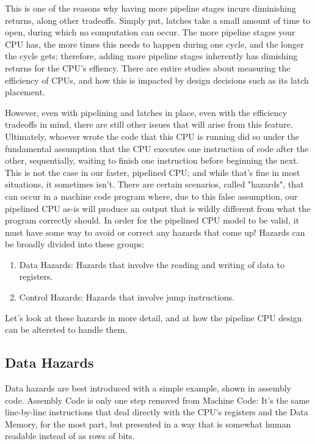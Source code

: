 \documentclass[12pt,twoside]{reedthesis}
\begin{document}
This is one of the reasons why having more pipeline stages incurs diminishing returns, along other tradeoffs. Simply put, latches take a small amount of time to open, during which no computation can occur. The more pipeline stages your CPU has, the more times this needs to happen during one cycle, and the longer the cycle gets; therefore, adding more pipeline stages inherently has dimishing returns for the CPU's effiency. There are entire studies about measuring the efficiency of CPUs, and how this is impacted by design decisions such as its latch placement.

However, even with pipelining and latches in place, even with the efficiency tradeoffs in mind, there are still other issues that will arise from this feature. Ultimately, whoever wrote the code that this CPU is running did so under the fundamental assumption that the CPU executes one instruction of code after the other, sequentially, waiting to finish one instruction before beginning the next.
This is not the case in our faster, pipelined CPU; and while that's fine in most situations, it sometimes isn't.
There are certain scenarios, called "hazards", that can occur in a machine code program where, due to this false assumption, our pipelined CPU as-is will produce an output that is wildly different from what the program correctly should. In order for the pipelined CPU model to be valid, it must  have some way to avoid or correct any hazards that come up! Hazards can be broadly divided into these groups:

\begin{enumerate}
	\item Data Hazards: Hazards that involve the reading and writing of data to registers.

	\item Control Hazards: Hazards that involve jump instructions.
\end{enumerate}


Let's look at these hazards in more detail, and at how the pipeline CPU design can be altereted to handle them.

\subsection{Data Hazards}

Data hazards are best introduced with a simple example, shown in assembly code. Assembly Code is only one step removed from Machine Code: It's the same line-by-line instructions that deal directly with the CPU's registers and the Data Memory, for the most part, but presented in a way that is somewhat human readable instead of as rows of bits.
\end{document}
